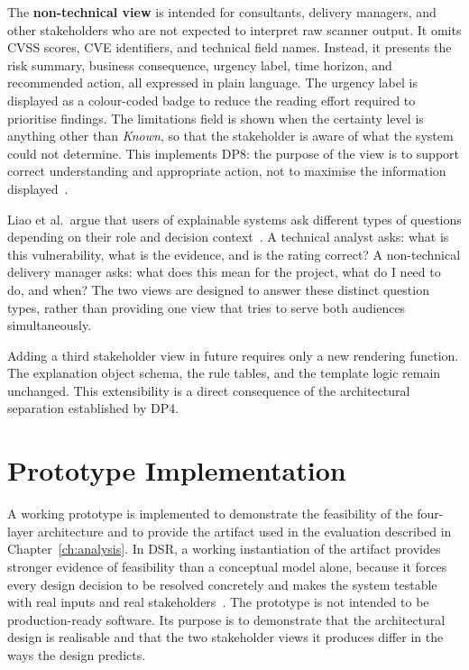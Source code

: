 The \textbf{non-technical view} is intended for consultants, delivery managers, and other stakeholders who are not expected to interpret raw scanner output. It omits \ac{CVSS} scores, \ac{CVE} identifiers, and technical field names. Instead, it presents the risk summary, business consequence, urgency label, time horizon, and recommended action, all expressed in plain language. The urgency label is displayed as a colour-coded badge to reduce the reading effort required to prioritise findings. The limitations field is shown when the certainty level is anything other than \textit{Known}, so that the stakeholder is aware of what the system could not determine. This implements DP8: the purpose of the view is to support correct understanding and appropriate action, not to maximise the information displayed~\cite{miller2019explanation}.

Liao et al.\ argue that users of explainable systems ask different types of questions depending on their role and decision context~\cite{liao2020questioning}. A technical analyst asks: what is this vulnerability, what is the evidence, and is the rating correct? A non-technical delivery manager asks: what does this mean for the project, what do I need to do, and when? The two views are designed to answer these distinct question types, rather than providing one view that tries to serve both audiences simultaneously.

Adding a third stakeholder view in future requires only a new rendering function. The explanation object schema, the rule tables, and the template logic remain unchanged. This extensibility is a direct consequence of the architectural separation established by DP4.

\section{Prototype Implementation}
\label{sec:prototype}

A working prototype is implemented to demonstrate the feasibility of the four-layer architecture and to provide the artifact used in the evaluation described in Chapter~\ref{ch:analysis}. In \ac{DSR}, a working instantiation of the artifact provides stronger evidence of feasibility than a conceptual model alone, because it forces every design decision to be resolved concretely and makes the system testable with real inputs and real stakeholders~\cite{hevner2004dsr}. The prototype is not intended to be production-ready software. Its purpose is to demonstrate that the architectural design is realisable and that the two stakeholder views it produces differ in the ways the design predicts.

